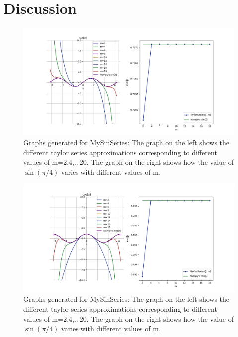 \documentclass[12pt]{article}
\begin{document}
\section[]{Discussion}
\begin{figure}[H]
	\centering
	\includegraphics[width=\linewidth]{graph1}
	\caption[Graphs generated for MySinSeries]{Graphs generated for MySinSeries: The graph on the left shows the different taylor series approximations corresponding to different values of m=2,4,...20. The graph on the right shows how the value of $\sin(\pi/4)$ varies with different values of m.}
	\label{fig:graph1}
\end{figure}
\begin{figure}[H]
	\centering
	\includegraphics[width=\linewidth]{graph2}
	\caption[Graphs generated for MySinSeries]{Graphs generated for MySinSeries: The graph on the left shows the different taylor series approximations corresponding to different values of m=2,4,...20. The graph on the right shows how the value of $\sin(\pi/4)$ varies with different values of m.}
	\label{fig:graph2}
\end{figure}
\end{document}
